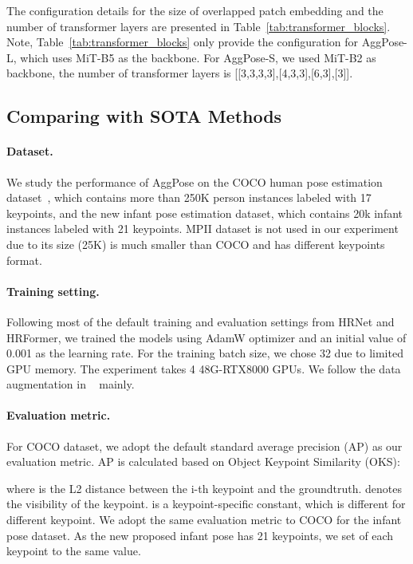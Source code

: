 \documentclass{article}
\begin{document}
The configuration details for the size of overlapped patch embedding and the number of transformer layers are presented in Table~\ref{tab:transformer_blocks}. Note, Table~\ref{tab:transformer_blocks} only provide the configuration for AggPose-L, which uses MiT-B5 as the backbone. For AggPose-S, we used MiT-B2 as backbone, the number of transformer layers is [[3,3,3,3],[4,3,3],[6,3],[3]].

\subsection{Comparing with SOTA Methods}

\paragraph{Dataset.} We study the performance of AggPose on the COCO human pose estimation dataset~\cite{lin2014microsoft}, which contains more than 250K person instances labeled with 17 keypoints, and the new infant pose estimation dataset, which contains 20k infant instances labeled with 21 keypoints. MPII dataset is not used in our experiment due to its size (25K) is much smaller than COCO and has different keypoints format.

\paragraph{Training setting.} Following most of the default training and evaluation settings from HRNet and HRFormer, we trained the models using AdamW optimizer and an initial value of 0.001 as the learning rate. For the training batch size, we chose 32 due to limited GPU memory. The experiment takes 4  48G-RTX8000 GPUs. We follow the data augmentation in ~\cite{wang2020deep} mainly. 

\paragraph{Evaluation metric.} For COCO dataset, we adopt the default standard average precision (AP) as our evaluation metric. AP is calculated based on Object Keypoint Similarity (OKS):



where  is the L2 distance between the i-th keypoint and the groundtruth.  denotes the visibility of the keypoint.  is a keypoint-specific constant, which is different for different keypoint. We adopt the same evaluation metric to COCO for the infant pose dataset. As the new proposed infant pose has 21 keypoints, we set  of each keypoint to the same value.
\end{document}

